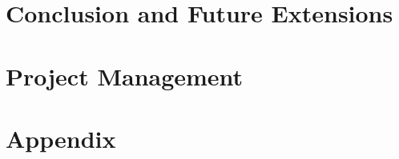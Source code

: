 \documentclass[11pt]{article}
\begin{document}
\section{Conclusion and Future Extensions}

\section{Project Management}

\section{Appendix}


\begin{thebibliography}{9}

\end{thebibliography}
\end{document}
